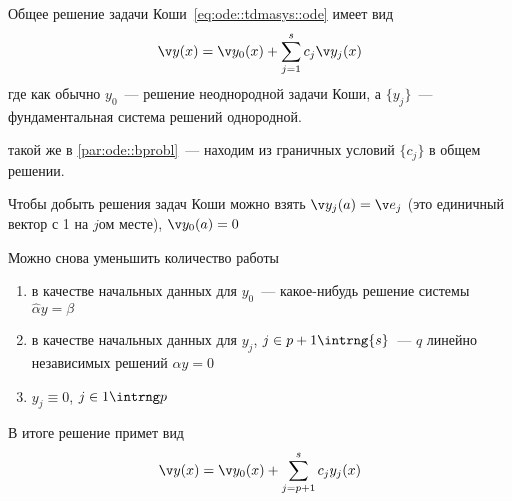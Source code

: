 \documentclass{trlnotes}
\begin{document}
Общее решение задачи Коши~\ref{eq:ode::tdmasys::ode} имеет вид
\[
  \v y(x) = \v y_0(x) + \sum_{j=1}^s c_j \v y_j(x)
\]
где как обычно $y_0$~--- решение неоднородной задачи Коши, а $\{y_{j}\}$~--- фундаментальная
система решений однородной.

 такой же в \ref{par:ode::bprobl}~--- находим
из граничных условий $\{c_j\}$ в общем решении.

Чтобы добыть решения задач Коши можно взять $\v y_j(a) = \v e_j$
(это единичный вектор с 1 на $j$ом месте), $\v y_0 (a) =0$

Можно снова уменьшить количество работы
\begin{enumerate}
  \item в качестве начальных данных для $y_0$~--- какое-нибудь решение системы $\hat α y = β$
  \item в качестве начальных данных для $y_j$, $j\in {p+1}\intrng {s}$~--- $q$ линейно независимых
    решений $\hat αy = 0$
  \item $y_j \equiv 0$, $j \in 1\intrng p$
\end{enumerate}

В итоге решение примет вид 
\[
  \v y(x) = \v y_0 (x) + \sum_{j=p+1}^{s} c_j y_j(x)
\]

\underdev

${}$\\
\end{document}
